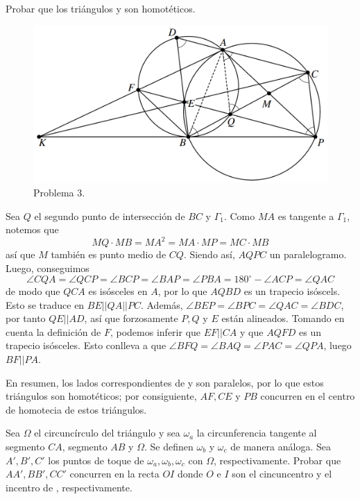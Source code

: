 \begin{hint}
    Probar que los triángulos  y  son homotéticos.
\end{hint}

\begin{figure}[H]
    \centering
    \includegraphics[width=12cm]{images/p3}
    \caption{Problema 3.}
\end{figure}

\begin{solution}
    Sea $Q$ el segundo punto de intersección de $BC$ y $\Gamma_1$.
    Como $MA$ es tangente a $\Gamma_1$, notemos que
    \[
        MQ \cdot MB = MA^2 = MA \cdot MP = MC \cdot MB
    \]
    así que $M$ también es punto medio de $CQ$.
    Siendo así, $AQPC$ un paralelogramo.
    Luego, conseguimos
    \[
        \angle CQA = \angle QCP = \angle BCP = \angle BAP = \angle PBA = 180^{\circ} - \angle ACP = \angle QAC
    \]
    de modo que $QCA$ es isósceles en $A$, por lo que $AQBD$ es un trapecio isóscels.
    Esto se traduce en $BE || QA || PC$.
    Además, $\angle BEP = \angle BPC = \angle QAC = \angle BDC$, por tanto $QE || AD$, así que forzosamente $P, Q$ y $E$ están alineados.
    Tomando en cuenta la definición de $F$, podemos inferir que $EF || CA$ y que $AQFD$ es un trapecio isósceles.
    Esto conlleva a que $\angle BFQ = \angle BAQ = \angle PAC = \angle QPA$, luego $BF || PA$.

    En resumen, los lados correspondientes de  y  son paralelos, por lo que estos triángulos son homotéticos; por consiguiente, $AF, CE$ y $PB$ concurren en el centro de homotecia de estos triángulos.
\end{solution}


\begin{section-problem}
    Sea $\Omega$ el circuncírculo del triángulo  y sea $\omega_a$ la circunferencia tangente al segmento $CA$, segmento $AB$ y $\Omega$.
    Se definen $\omega_b$ y $\omega_c$ de manera análoga.
    Sea $A', B', C'$ los puntos de toque de $\omega_a, \omega_b, \omega_c$ con $\Omega$, respectivamente.
    Probar que $AA', BB', CC'$ concurren en la recta $OI$ donde $O$ e $I$ son el cincuncentro y el incentro de , respectivamente.
\end{section-problem}

